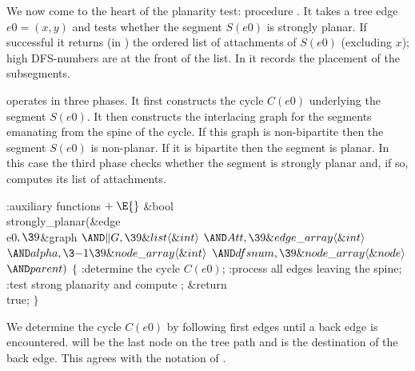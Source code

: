 We now come to the heart of the planarity test: procedure .
It takes a tree edge $e0 = (x,y)$ and tests whether
the segment $S(e0)$ is strongly planar. If  successful it returns  (in ) the
ordered list of attachments of $S(e0)$ (excluding $x$); high DFS-numbers are
at the front of the list. In  it
records the placement of the subsegments.

 operates in three phases. It first constructs the
cycle $C(e0)$
underlying the segment $S(e0)$. It then constructs the interlacing graph for
the
segments emanating from the spine of the cycle. If this graph is non-bipartite
then the segment $S(e0)$ is non-planar. If it is bipartite then the segment is
planar. In this case the third phase checks whether the segment is strongly
planar and, if so, computes its list of attachments.


\Y\B\4:auxiliary functions\X${}\mathrel+\E{}$\6
\&{bool} \\{strongly\_planar}(\&{edge} \\{e0}${},\39{}$\&{graph} ${}{\AND}\|G,%
\39\&{list}\langle\&{int}\rangle{}$ ${}{\AND}\\{Att},\39\&{edge\_array}\langle%
\&{int}\rangle{}$ ${}{\AND}\\{alpha},\3{-1}\39\&{node\_array}\langle\&{int}%
\rangle{}$ ${}{\AND}\\{dfsnum},\39\&{node\_array}\langle\&{node}\rangle{}$ ${}{%
\AND}\\{parent}){}$\1\1\2\2\6
${}\{{}$\1\6
:determine the cycle $C(e0)$\X;\6
:process all edges leaving the spine\X;\6
:test strong planarity and compute \X;\6
\&{return} \\{true};\6
\4${}\}{}$\2\par
\fi

We determine the cycle $C(e0)$ by following first edges until a back
edge is encountered.  will be the last node on the tree path and %
is the destination of the back edge. This agrees with the
notation of \cite{Me:book}.


